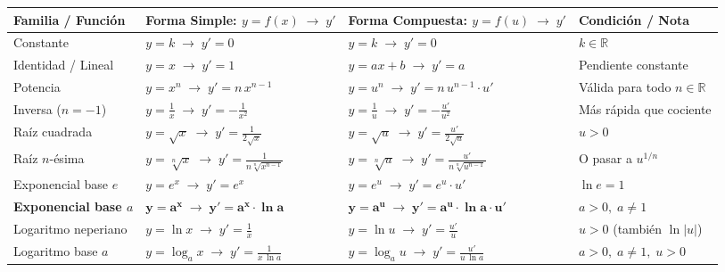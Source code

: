\documentclass[10pt,a4paper]{article}
\begin{document}
\begin{center}
\renewcommand{\arraystretch}{1.34}
\footnotesize
\begin{tabularx}{\linewidth}{@{}l >{\raggedright\arraybackslash}X >{\raggedright\arraybackslash}X l@{}}
\toprule
\textbf{Familia / Función} & \textbf{Forma Simple: $y = f(x) \;\longrightarrow\; y'$} & \textbf{Forma Compuesta: $y = f(u) \;\longrightarrow\; y'$} & \textbf{Condición / Nota} \\
\midrule
Constante & $y = k \;\longrightarrow\; y' = 0$ & $y = k \;\longrightarrow\; y' = 0$ & $k \in \mathbb{R}$ \\
Identidad / Lineal & $y = x \;\longrightarrow\; y' = 1$ & $y = ax + b \;\longrightarrow\; y' = a$ & Pendiente constante \\
Potencia & $y = x^n \;\longrightarrow\; y' = n\,x^{n-1}$ & $y = u^n \;\longrightarrow\; y' = n\,u^{n-1}\cdot u'$ & Válida para todo $n \in \mathbb{R}$ \\
Inversa ($n = -1$) & $\displaystyle y = \frac{1}{x} \;\longrightarrow\; y' = -\frac{1}{x^2}$ & $\displaystyle y = \frac{1}{u} \;\longrightarrow\; y' = -\frac{u'}{u^2}$ & Más rápida que cociente \\
Raíz cuadrada & $\displaystyle y = \sqrt{x} \;\longrightarrow\; y' = \frac{1}{2\sqrt{x}}$ & $\displaystyle y = \sqrt{u} \;\longrightarrow\; y' = \frac{u'}{2\sqrt{u}}$ & $u > 0$ \\
Raíz $n$-ésima & $\displaystyle y = \sqrt[n]{x} \;\longrightarrow\; y' = \frac{1}{n\sqrt[n]{x^{n-1}}}$ & $\displaystyle y = \sqrt[n]{u} \;\longrightarrow\; y' = \frac{u'}{n\sqrt[n]{u^{n-1}}}$ & O pasar a $u^{1/n}$ \\
\midrule
Exponencial base $e$ & $y = e^x \;\longrightarrow\; y' = e^x$ & $y = e^u \;\longrightarrow\; y' = e^u \cdot u'$ & $\ln e = 1$ \\
\rowcolor{softblue}
\textbf{Exponencial base $a$} & $\mathbf{y = a^x \;\longrightarrow\; y' = a^x \cdot \ln a}$ & $\mathbf{y = a^u \;\longrightarrow\; y' = a^u \cdot \ln a \cdot u'}$ & $a > 0,\; a \neq 1$ \\
Logaritmo neperiano & $\displaystyle y = \ln x \;\longrightarrow\; y' = \frac{1}{x}$ & $\displaystyle y = \ln u \;\longrightarrow\; y' = \frac{u'}{u}$ & $u > 0$ (también $\ln|u|$) \\
Logaritmo base $a$ & $\displaystyle y = \log_a x \;\longrightarrow\; y' = \frac{1}{x\,\ln a}$ & $\displaystyle y = \log_a u \;\longrightarrow\; y' = \frac{u'}{u\,\ln a}$ & $a > 0,\; a \neq 1,\; u > 0$ \\

\end{tabularx}
\end{center}
\end{document}
